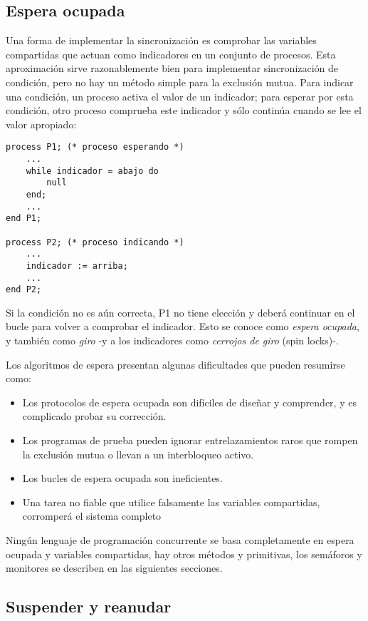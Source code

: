 \subsection{Espera ocupada}

Una forma de implementar la sincronización es comprobar las variables
compartidas que actuan como indicadores en un conjunto de procesos. Esta
aproximación sirve razonablemente bien para implementar sincronización de
condición, pero no hay un método simple para la exclusión mutua. Para indicar
una condición, un proceso activa el valor de un indicador; para esperar por esta
condición, otro proceso comprueba este indicador y sólo continúa cuando se lee
el valor apropiado:

\begin{lstlisting}
process P1; (* proceso esperando *)
	...
	while indicador = abajo do
		null
	end;
	...
end P1;

process P2; (* proceso indicando *)
	...
	indicador := arriba;
	...
end P2;
\end{lstlisting}

Si la condición no es aún correcta, P1 no tiene elección y deberá continuar en
el bucle para volver a comprobar el indicador. Esto se conoce como \emph{espera
ocupada}, y también como \emph{giro} -y a los indicadores como \emph{cerrojos de
giro} (spin locks)-.

Los algoritmos de espera presentan algunas dificultades que pueden resumirse
como:

\begin{itemize}
\item Los protocolos de espera ocupada son difíciles de diseñar y comprender, y
	es complicado probar su corrección.
\item Los programas de prueba pueden ignorar entrelazamientos raros que rompen
	la exclusión mutua o llevan a un interbloqueo activo.
\item Los bucles de espera ocupada son ineficientes.
\item Una tarea no fiable que utilice falsamente las variables compartidas,
	corromperá el sistema completo
\end{itemize}

Ningún lenguaje de programación concurrente se basa completamente en espera
ocupada y variables compartidas, hay otros métodos y primitivas, los semáforos y
monitores se describen en las siguientes secciones.

\subsection{Suspender y reanudar}

